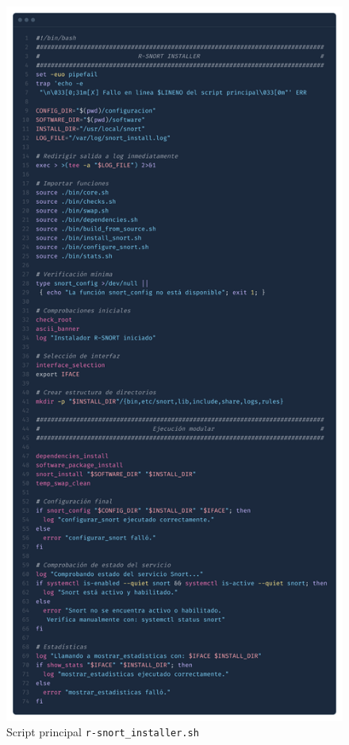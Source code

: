 \documentclass[11pt,a4paper,twoside]{report}
\begin{document}
\begin{figure}[H]
	\centering
	\includegraphics[scale=0.08]{script_automatico/1.png}
	\caption{Script principal \texttt{r-snort\_installer.sh}}
	\label{fig:r-snort_installer}
\end{figure}
\end{document}
